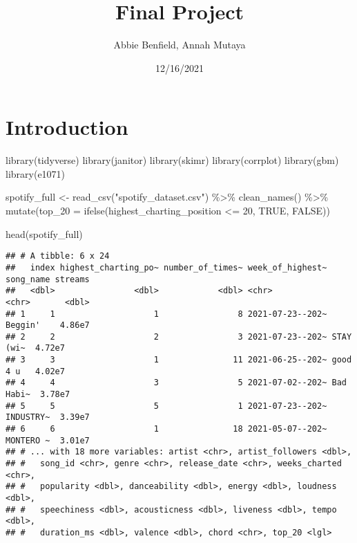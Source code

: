 \documentclass[
]{article}
\title{Final Project}
\author{Abbie Benfield, Annah Mutaya}
\date{12/16/2021}
\newenvironment{Shaded}{\begin{snugshade}}{\end{snugshade}}
\newcommand{\AttributeTok}[1]{\textcolor[rgb]{0.77,0.63,0.00}{#1}}
\newcommand{\ConstantTok}[1]{\textcolor[rgb]{0.00,0.00,0.00}{#1}}
\newcommand{\DecValTok}[1]{\textcolor[rgb]{0.00,0.00,0.81}{#1}}
\newcommand{\FunctionTok}[1]{\textcolor[rgb]{0.00,0.00,0.00}{#1}}
\newcommand{\NormalTok}[1]{#1}
\newcommand{\OtherTok}[1]{\textcolor[rgb]{0.56,0.35,0.01}{#1}}
\newcommand{\SpecialCharTok}[1]{\textcolor[rgb]{0.00,0.00,0.00}{#1}}
\newcommand{\StringTok}[1]{\textcolor[rgb]{0.31,0.60,0.02}{#1}}
\begin{document}
\maketitle

\hypertarget{introduction}{%
\section{Introduction}\label{introduction}}

\begin{Shaded}
\begin{Highlighting}[]
\FunctionTok{library}\NormalTok{(tidyverse)}
\FunctionTok{library}\NormalTok{(janitor)}
\FunctionTok{library}\NormalTok{(skimr)}
\FunctionTok{library}\NormalTok{(corrplot)}
\FunctionTok{library}\NormalTok{(gbm)}
\FunctionTok{library}\NormalTok{(e1071)}

\NormalTok{spotify\_full }\OtherTok{\textless{}{-}} \FunctionTok{read\_csv}\NormalTok{(}\StringTok{"spotify\_dataset.csv"}\NormalTok{) }\SpecialCharTok{\%\textgreater{}\%}
  \FunctionTok{clean\_names}\NormalTok{() }\SpecialCharTok{\%\textgreater{}\%}
  \FunctionTok{mutate}\NormalTok{(}\AttributeTok{top\_20 =} \FunctionTok{ifelse}\NormalTok{(highest\_charting\_position }\SpecialCharTok{\textless{}=} \DecValTok{20}\NormalTok{, }\ConstantTok{TRUE}\NormalTok{, }\ConstantTok{FALSE}\NormalTok{))}

\FunctionTok{head}\NormalTok{(spotify\_full)}
\end{Highlighting}
\end{Shaded}

\begin{verbatim}
## # A tibble: 6 x 24
##   index highest_charting_po~ number_of_times~ week_of_highest~ song_name streams
##   <dbl>                <dbl>            <dbl> <chr>            <chr>       <dbl>
## 1     1                    1                8 2021-07-23--202~ Beggin'    4.86e7
## 2     2                    2                3 2021-07-23--202~ STAY (wi~  4.72e7
## 3     3                    1               11 2021-06-25--202~ good 4 u   4.02e7
## 4     4                    3                5 2021-07-02--202~ Bad Habi~  3.78e7
## 5     5                    5                1 2021-07-23--202~ INDUSTRY~  3.39e7
## 6     6                    1               18 2021-05-07--202~ MONTERO ~  3.01e7
## # ... with 18 more variables: artist <chr>, artist_followers <dbl>,
## #   song_id <chr>, genre <chr>, release_date <chr>, weeks_charted <chr>,
## #   popularity <dbl>, danceability <dbl>, energy <dbl>, loudness <dbl>,
## #   speechiness <dbl>, acousticness <dbl>, liveness <dbl>, tempo <dbl>,
## #   duration_ms <dbl>, valence <dbl>, chord <chr>, top_20 <lgl>
\end{verbatim}
\end{document}
